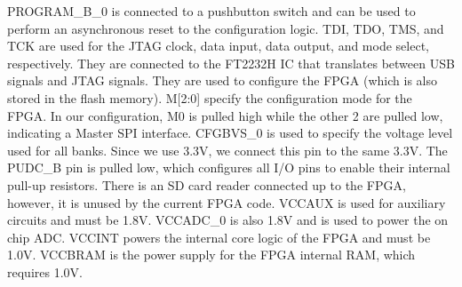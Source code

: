PROGRAM\_B\_0 is connected to a pushbutton switch and can be used to perform an asynchronous reset
to the configuration logic. TDI, TDO, TMS, and TCK are used for the JTAG clock, data input, data
output, and mode select, respectively. They are connected to the FT2232H IC that translates between
USB signals and JTAG signals. They are used to configure the FPGA (which is also stored in the flash
memory). M[2:0] specify the configuration mode for the FPGA\@. In our configuration, M0 is pulled
high while the other 2 are pulled low, indicating a Master SPI interface. CFGBVS\_0 is used to
specify the voltage level used for all banks. Since we use 3.3V, we connect this pin to the same
3.3V. The PUDC\_B pin is pulled low, which configures all I/O pins to enable their internal pull-up
resistors. There is an SD card reader connected up to the FPGA, however, it is unused by the current
FPGA code. VCCAUX is used for auxiliary circuits and must be 1.8V. VCCADC\_0 is also 1.8V and is
used to power the on chip ADC\@. VCCINT powers the internal core logic of the FPGA and must be
1.0V. VCCBRAM is the power supply for the FPGA internal RAM, which requires 1.0V.

